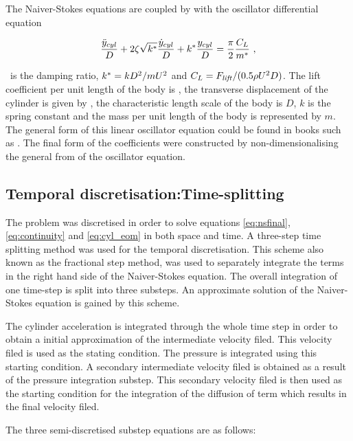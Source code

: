   The Naiver-Stokes equations are coupled by with the oscillator differential equation 
  
  \begin{equation} \centering
  \label{eq:cyl_eom}
  \frac{\ddot{y}_{cyl}}{D} + 2\damping\sqrt{\kstar}\frac{\dot{y}_{cyl}}{D} + \kstar\frac{\ycyl}{D} = \frac{\pi}{2}\frac{\clift}{\mstar} ~,
  \end{equation}

  
  
  
    \damping \ is the damping ratio,  $k^{*}=kD^{2}/mU^{2}$ and
    $C_{L} = F_{\mathit{lift}}/(0.5\rho U^{2}D)$. The lift
    coefficient per unit length of the body is \clift, the transverse displacement of the cylinder is given by \ycyl,  the characteristic length scale of the body is $D$, $k$ is the spring constant and the mass per unit length of the body is represented by $m$. The general form of this linear oscillator equation could be found in books such as  \citet{Naudascher:94}. The final form of the coefficients were constructed by non-dimensionalising the general from of the oscillator equation. 
    
    
 
 \subsection{Temporal discretisation:Time-splitting}
 
 The problem was discretised in order to solve equations \ref{eq:nsfinal}, \ref{eq:continuity} and \ref{eq:cyl_eom} in both space and time. A three-step time splitting method was used for the temporal discretisation. This scheme also known as the fractional step method, was used to separately integrate the terms in the right hand side of the Naiver-Stokes equation. The overall integration of one time-step is split into three substeps. An approximate solution of the Naiver-Stokes equation is gained by this scheme. 
 
 The cylinder acceleration is integrated through the whole time step in order to obtain a initial approximation of the intermediate velocity filed. This velocity filed is used as the stating condition. The pressure is integrated using this starting condition.  A secondary intermediate velocity filed is obtained as a result of the pressure integration substep. This secondary velocity filed is then used as the starting condition for the integration of the diffusion of term which results in the final velocity filed. 
 
 The three semi-discretised substep equations are as follows:
 
